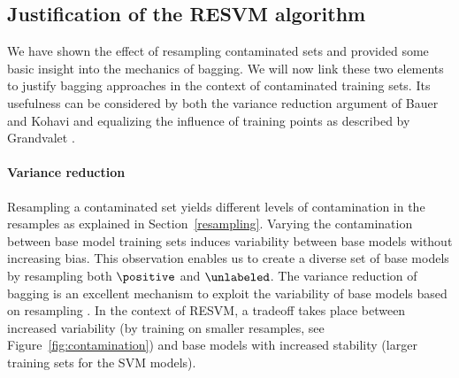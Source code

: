 \subsection{Justification of the RESVM algorithm}
We have shown the effect of resampling contaminated sets and provided some basic insight into the mechanics of bagging. We will now link these two elements to justify bagging approaches in the context of contaminated training sets. Its usefulness can be considered by both the variance reduction argument of Bauer and Kohavi \citep{bauer1999empirical} and equalizing the influence of training points as described by Grandvalet \citep{grandvalet2004bagging}.

\paragraph{Variance reduction} Resampling a contaminated set yields different levels of contamination in the resamples as explained in Section~\ref{resampling}. Varying the contamination between base model training sets induces variability between base models without increasing bias. This observation enables us to create a diverse set of base models by resampling both $\positive$ and $\unlabeled$. The variance reduction of bagging is an excellent mechanism to exploit the variability of base models based on resampling \citep{bauer1999empirical,breiman2000randomizing}. In the context of RESVM, a tradeoff takes place between increased variability (by training on smaller resamples, see Figure~\ref{fig:contamination}) and base models with increased stability (larger training sets for the SVM models).

